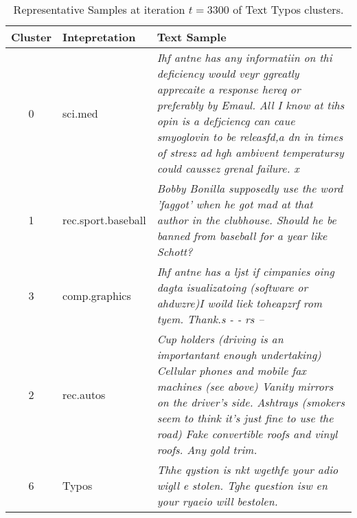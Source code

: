 \begin{table}[H]
    \centering
    \scriptsize
    \begin{tabularx}{\textwidth}{c|l|X}
        \hline
        \textbf{Cluster} & \textbf{Intepretation} & \textbf{Text Sample}                                                                                                                                                                                                                                                                             \\
        \hline
        0                & sci.med                & \emph{Ihf antne has any informatiin on thi deficiency would veyr ggreatly apprecaite a response hereq or preferably by Emaul. All I know at tihs opin is a defjciencg can caue smyoglovin to be releasfd,a dn in times of stresz ad hgh ambivent temperatursy could caussez grenal failure. x} \\
        \hline
        1                & rec.sport.baseball     & \emph{Bobby Bonilla supposedly use the word 'faggot' when he got mad at that author in the clubhouse. Should he be banned from baseball for a year like Schott?}                                                                                                                               \\
        \hline
        3                & comp.graphics          & \emph{Ihf antne has a ljst if cimpanies oing dagta isualizatoing (software or ahdwzre)I woild liek toheapzrf rom tyem. Thank.s - - rs --}                                                                                                                                                      \\
        \hline
        2                & rec.autos              & \emph{Cup holders (driving is an importantant enough undertaking) Cellular phones and mobile fax machines (see above) Vanity mirrors on the driver's side. Ashtrays (smokers seem to think it's just fine to use the road) Fake convertible roofs and vinyl roofs. Any gold trim.}             \\
        \hline
        6                & Typos                  & \emph{Thhe qystion is nkt wgethfe your adio wigll e stolen. Tghe question isw en your ryaeio will bestolen.}                                                                                                                                                                                   \\
        \hline
    \end{tabularx}
    \caption{Representative Samples at iteration $t=3300$ of Text Typos clusters.}
\end{table}